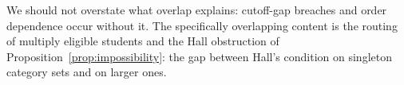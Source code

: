\documentclass[a4paper,twoside]{article}
\theoremstyle{definition}
\renewcommand{\T}{\mathcal{T}}
\begin{document}
We should not overstate what overlap explains: cutoff-gap breaches and order dependence occur without it. The specifically overlapping content is the routing of multiply eligible students and the Hall obstruction of Proposition~\ref{prop:impossibility}: the gap between Hall's condition on singleton category sets and on larger ones.






\end{document}
